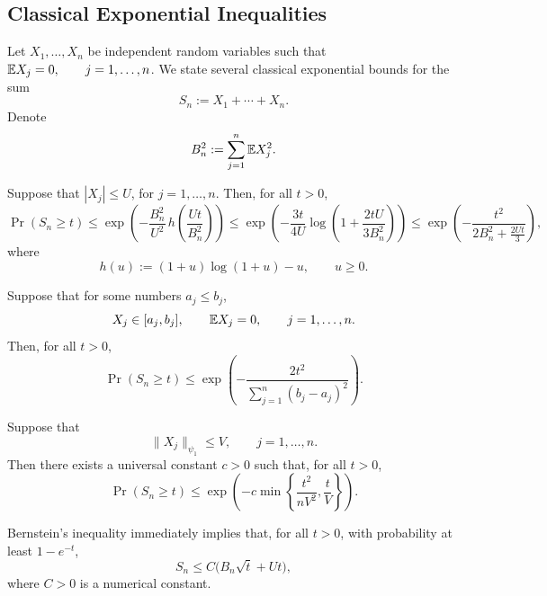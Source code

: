 \subsection{Classical Exponential Inequalities}\label{sec:A1}

Let $X_1,\ldots,X_n$ be independent random variables such that $\mathbb{E} X_j = 0, \qquad j=1,\ldots,n$. We state several classical exponential bounds for the sum
\[
  S_n:=X_1+\cdots+X_n.
\]
Denote
\[
  B_n^2:=\sum_{j=1}^n \mathbb{E} X_j^2.
\]


\begin{theorem} \label{thm:bennett-prokhorov-bernstein}
  Suppose that
  $|X_j|\le U$, for $j=1,\ldots,n$. Then, for all $t>0$,
  \[
    \Pr(S_n\ge t)
    \leq
    \exp\left(
    -\frac{B_n^2}{U^2}\,
    h\!\left(\frac{Ut}{B_n^2}\right)
    \right)
    \leq
    \exp\left(
    -\frac{3t}{4U}\log\!\left(1+\frac{2tU}{3B_n^2}\right)
    \right)
    \le
    \exp\left(
    -\frac{t^2}{2B_n^2+\frac{2Ut}{3}}
    \right),
  \]
  where
  \[
    h(u):=(1+u)\log(1+u)-u, \qquad u\ge 0.
  \]
\end{theorem}

\begin{theorem} \label{thm:hoeffding}
  Suppose that for some numbers $a_j\le b_j$,
  \[
    X_j\in [a_j,b_j], \qquad \mathbb{E} X_j=0, \qquad j=1,\ldots,n.
  \]
  Then, for all $t>0$,
  \[
    \Pr(S_n\ge t)
    \le
    \exp\left(
    -\frac{2t^2}{\sum_{j=1}^n (b_j-a_j)^2}
    \right).
  \]
\end{theorem}

\begin{theorem} \label{thm:bernstein-psi1}
  Suppose that
  \[
    \|X_j\|_{\psi_1}\le V, \qquad j=1,\ldots,n.
  \]
  Then there exists a universal constant $c>0$ such that, for all $t>0$,
  \[
    \Pr(S_n\ge t)
    \le
    \exp\left(
    -c\min\left\{\frac{t^2}{nV^2},\frac{t}{V}\right\}
    \right).
  \]
\end{theorem}

Bernstein's inequality immediately implies that, for all $t>0$, with probability at least $1-e^{-t}$,
\[
  S_n \le C\bigl(B_n\sqrt{t}+Ut\bigr),
\]
where $C>0$ is a numerical constant.